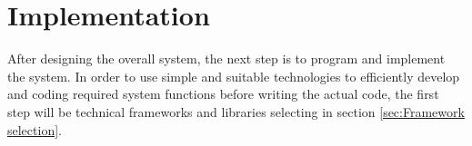 \chapter{Implementation}
\label{chap:Implementation}
After designing the overall system, the next step is to program and implement the system.
In order to use simple and suitable technologies to efficiently develop and coding required system functions before writing the actual code, the first step will be technical frameworks and libraries selecting in section \ref{sec:Framework selection}.




